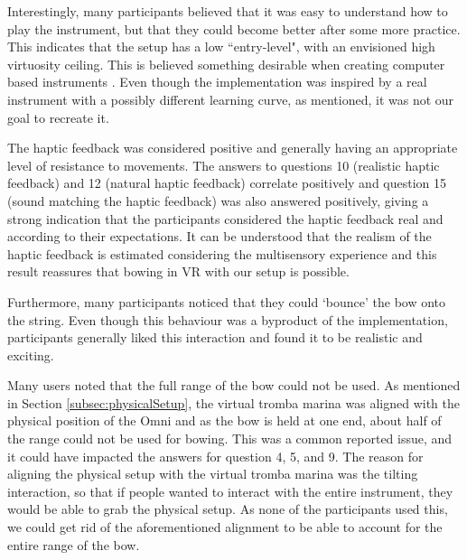 \documentclass[dvipsnames, pdftex]{article}
\begin{document}
Interestingly, many participants believed that it was easy to understand how to play the instrument, but that they could become better after some more practice. %
This indicates that the setup has a low ``entry-level", with an envisioned high virtuosity ceiling. This is believed something desirable when creating computer based instruments \cite{Wessel2002}. Even though the implementation was inspired by a real instrument with a possibly different learning curve, as mentioned, it was not our goal to recreate it.  

The haptic feedback was considered positive and generally having an appropriate level of resistance to movements. The answers to questions 10 (realistic haptic feedback) and 12 (natural haptic feedback) correlate positively and question 15 (sound matching the haptic feedback) was also answered positively, giving a strong indication that the participants considered the haptic feedback real and according to their expectations.  It can be understood that the realism of the haptic feedback is estimated considering the multisensory experience and this result reassures that bowing in VR with our setup is possible.

Furthermore, many participants noticed that they could `bounce' the bow onto the string. Even though this behaviour was a byproduct of the implementation, participants generally liked this interaction and found it to be realistic and exciting.  

Many users noted that the full range of the bow could not be used. As mentioned in Section \ref{subsec:physicalSetup}, the virtual tromba marina was aligned with the physical position of the Omni and as the bow is held at one end, about half of the range could not be used for bowing. This was a common reported issue, and it could have impacted the answers for question 4, 5, and 9. The reason for aligning the physical setup with the virtual tromba marina was the tilting interaction, so that if people wanted to interact with the entire instrument, they would be able to grab the physical setup. As none of the participants used this, we could get rid of the aforementioned alignment to be able to account for the entire range of the bow. %
\end{document}
